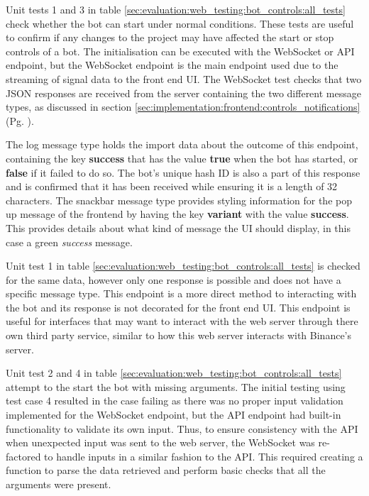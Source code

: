 Unit tests 1 and 3 in table \ref{sec:evaluation:web_testing:bot_controls:all_tests} check whether the bot can start under normal conditions. These tests are useful to confirm if any changes to the project may have affected the start or stop controls of a bot. The initialisation can be executed with the WebSocket or API endpoint, but the WebSocket endpoint is the main endpoint used due to the streaming of signal data to the front end UI. The WebSocket test checks that two JSON responses are received from the server containing the two different message types, as discussed in section \ref{sec:implementation:frontend:controls_notifications} (Pg. \pageref{sec:implementation:frontend:controls_notifications}). 

The log message type holds the import data about the outcome of this endpoint, containing the key \textbf{success} that has the value \textbf{true} when the bot has started, or \textbf{false} if it failed to do so. The bot's unique hash ID is also a part of this response and is confirmed that it has been received while ensuring it is a length of 32 characters. The snackbar message type provides styling information for the pop up message of the frontend by having the key \textbf{variant} with the value \textbf{success}. This provides details about what kind of message the UI should display, in this case a green \textit{success} message.

Unit test 1 in table \ref{sec:evaluation:web_testing:bot_controls:all_tests} is checked for the same data, however only one response is possible and does not have a specific message type. This endpoint is a more direct method to interacting with the bot and its response is not decorated for the front end UI. This endpoint is useful for interfaces that may want to interact with the web server through there own third party service, similar to how this web server interacts with Binance's server. 

Unit test 2 and 4 in table \ref{sec:evaluation:web_testing:bot_controls:all_tests} attempt to the start the bot with missing arguments. The initial testing using test case 4 resulted in the case failing as there was no proper input validation implemented for the WebSocket endpoint, but the API endpoint had built-in functionality to validate its own input. Thus, to ensure consistency with the API when unexpected input was sent to the web server, the WebSocket was re-factored to handle inputs in a similar fashion to the API. This required creating a function to parse the data retrieved and perform basic checks that all the arguments were present. 

